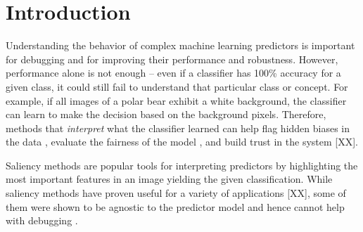 \documentclass{article}
\begin{document}

\begin{abstract}
 
\end{abstract}

\section{Introduction}

Understanding the behavior of complex machine learning predictors is important for debugging and for improving their performance and robustness. However, performance alone is not enough -- even if a classifier has 100\% accuracy for a given class, it could still fail to understand that particular class or concept. For example, if all images of a polar bear exhibit a white background, the classifier can learn to make the decision based on the background pixels. Therefore, methods that \emph{interpret} what the classifier learned can help flag hidden biases in the data \cite{buolamwini2018gender}, evaluate the fairness of the model \cite{doshi2017towards}, and build trust in the system [XX]. 

Saliency methods \cite{simonyan2013deep,springenberg2014striving,selvaraju2016grad,smilkov2017smoothgrad} are popular tools for interpreting predictors by highlighting the most important features in an image yielding the given classification. While saliency methods have proven useful for a variety of applications [XX], some of them were shown to be agnostic to the predictor model and hence cannot help with debugging \cite{adebayo2018sanity}. 
\end{document}
